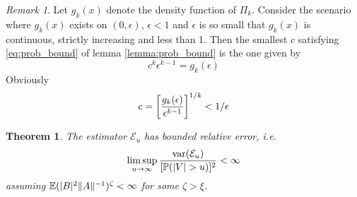 \documentclass{article}
\newtheorem{theorem}{Theorem}
\theoremstyle{remark}
\newtheorem{remark}{Remark}
\begin{document}
\begin{remark}\label{remark:inf_c}
  Let $g_k(x)$ denote the density function of $\Pi_k$. Consider the
  scenario where $g_k(x)$ exists on $(0, \epsilon)$, $\epsilon < 1$
  and $\epsilon$ is so small that $g_k(x)$ is continuous, strictly
  increasing and less than 1. Then the smallest $c$ satisfying
  \eqref{eq:prob_bound} of lemma \ref{lemma:prob_bound} is the one
  given by
  \[
  c^k \epsilon^{k-1} = g_k(\epsilon)
  \]
  Obviously
  \[
  c = \left[
    {g_k(\epsilon) \over \epsilon^{k-1}}
  \right]^{1/k} < 1/\epsilon
  \]
\end{remark}

\begin{theorem}
  The estimator $\mathcal E_u$ has bounded relative error, i.e.
  \begin{equation*}
    \limsup_{u \to \infty} {\text{var}(\mathcal E_u) \over [\mathbb{P}(|V| > u)]^2} < \infty
  \end{equation*}
  assuming $\mathbb{E} (|B|^2 \|A\|^{-1})^\zeta < \infty$ for some $\zeta > \xi$.
\end{theorem}
\end{document}
